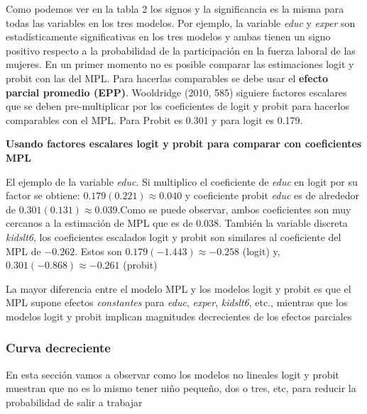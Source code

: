\documentclass[
  letterpaper,
  DIV=11,
  numbers=noendperiod]{scrreprt}
\begin{document}
Como podemos ver en la tabla 2 los signos y la significancia es la misma
para todas las variables en los tres modelos. Por ejemplo, la variable
\emph{educ} y \emph{exper} son estadísticamente significativas en los
tres modelos y ambas tienen un signo positivo respecto a la probabilidad
de la participación en la fuerza laboral de las mujeres. En un primer
momento no es posible comparar las estimaciones logit y probit con las
del MPL. Para hacerlas comparables se debe usar el \textbf{efecto
parcial promedio (EPP)}. Wooldridge (2010, 585) siguiere factores
escalares que se deben pre-multiplicar por los coeficientes de logit y
probit para hacerlos comparables con el MPL. Para Probit es 0.301 y para
logit es 0.179.

\textbf{Usando factores escalares logit y probit para comparar con
coeficientes MPL}

El ejemplo de la variable \emph{educ}. Si multiplico el coeficiente de
\emph{educ} en logit por su factor se obtiene:
\(0.179(0.221)\approx0.040\) y coeficiente probit \emph{educ} es de
alrededor de \(0.301(0.131)\approx0.039\).Como se puede observar, ambos
coeficientes son muy cercanos a la estimación de MPL que es de
\(0.038\). También la variable discreta \emph{kidslt6}, los coeficientes
escalados logit y probit son similares al coeficiente del MPL de
\(-0.262\). Estos son \(0.179(-1.443)\approx-0.258\) (logit) y,
\(0.301(-0.868)\approx-0.261\) (probit)

La mayor diferencia entre el modelo MPL y los modelos logit y probit es
que el MPL supone efectos \emph{constantes} para \emph{educ},
\emph{exper}, \emph{kidslt6}, etc., mientras que los modelos logit y
probit implican magnitudes decrecientes de los efectos parciales

\subsubsection{Curva decreciente}\label{curva-decreciente}

En esta sección vamos a observar como los modelos no lineales logit y
probit muestran que no es lo mismo tener niño pequeño, dos o tres, etc,
para reducir la probabilidad de salir a trabajar
\end{document}
